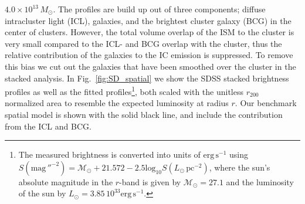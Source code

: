 \documentclass[10pt,aps,pra,reprint,amsmath,amsfonts,amssymb,showpacs,nofootinbib,floatfix]{revtex4-1}
\newcommand{\rmn}{\mathrm}
\newcommand{\msun}{M_\odot}
\newcommand{\rvir}{r_{200}}
\begin{document}
$4.0\times10^{13}\,\msun$. The profiles are build up out of three
components; diffuse intracluster light (ICL), galaxies, and the
brightest cluster galaxy (BCG) in the center of clusters. However, the
total volume overlap of the ISM to the cluster is very small compared
to the ICL- and BCG overlap with the cluster, thus the relative
contribution of the galaxies to the IC emission is suppressed. To
remove this bias we cut out the galaxies that have been smoothed over
the cluster in the stacked analysis. In Fig.~\ref{fig:SD_spatial} we
show the SDSS stacked brightness profiles as well as the fitted
profiles\footnote{The measured brightness is converted into units of
  $\rmn{erg}\,\rmn{s}^{-1}$ using \cite{2010...book}
  $S(\rmn{mag}\,''^{-2}) =
  \mathcal{M}_\odot+21.572-2.5\rmn{log}_{10}S(L_\odot\,\rmn{pc}^{-2})$,
  where the sun's absolute magnitude in the $r$-band is given by
  $\mathcal{M}_\odot=27.1$ \cite{1998gaas.book.....B} and the
  luminosity of the sun by $L_\odot=3.85\,10^{33}
  \rmn{erg}\,\rmn{s}^{-1}$.}, both scaled with the unitless $\rvir$
normalized area to resemble the expected luminosity at radius
$r$. Our benchmark spatial model is shown with the solid black line,
and include the contribution from the ICL and BCG.
\end{document}
